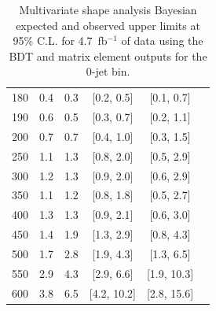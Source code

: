 \begin{table}
\begin{center}
\begin{tabular}{c c c c c c}
180 & 0.4 & 0.3 & [0.2, 0.5] & [0.1, 0.7] \\
190 & 0.6 & 0.5 & [0.3, 0.7] & [0.2, 1.1] \\
200 & 0.7 & 0.7 & [0.4, 1.0] & [0.3, 1.5] \\
250 & 1.1 & 1.3 & [0.8, 2.0] & [0.5, 2.9] \\
300 & 1.2 & 1.3 & [0.9, 2.0] & [0.6, 2.9] \\
350 & 1.1 & 1.2 & [0.8, 1.8] & [0.5, 2.7] \\
400 & 1.3 & 1.3 & [0.9, 2.1] & [0.6, 3.0] \\
450 & 1.4 & 1.9 & [1.3, 2.9] & [0.8, 4.3] \\
500 & 1.7 & 2.8 & [1.9, 4.3] & [1.3, 6.5] \\
550 & 2.9 & 4.3 & [2.9, 6.6] & [1.9, 10.3] \\
600 & 3.8 & 6.5 & [4.2, 10.2] & [2.8, 15.6] \\
\hline\hline
\end{tabular}
\end{center}
\caption{Multivariate shape analysis Bayesian expected and observed upper limits at 95\% C.L.
for 4.7~fb$^{-1}$ of data using the BDT and matrix element outputs for the 0-jet bin.}
\label{tab:me_expected_5fb}
\end{table}

